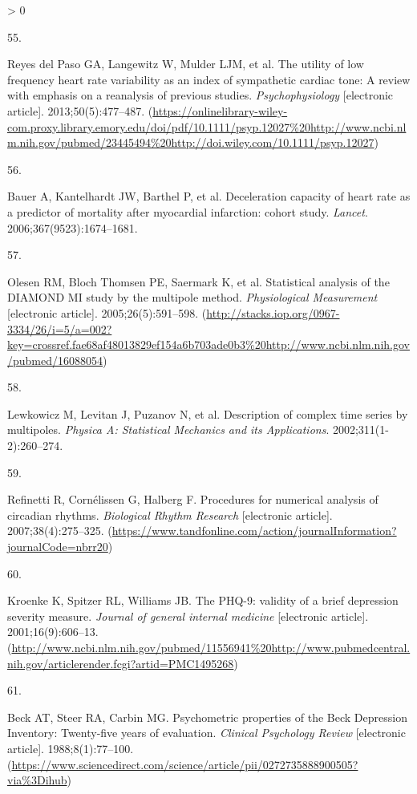 \documentclass[
  11pt,
  openany]{book}
\newlength{\cslhangindent}
\newlength{\csllabelwidth}
\newenvironment{CSLReferences}[2] %
 {%
  \setlength{\parindent}{0pt}
  \ifodd #1 \everypar{\setlength{\hangindent}{\cslhangindent}}\ignorespaces\fi
  \ifnum #2 > 0
  \setlength{\parskip}{#2\baselineskip}
  \fi
 }%
 {}
\newcommand{\CSLLeftMargin}[1]{\parbox[t]{\csllabelwidth}{#1}}
\newcommand{\CSLRightInline}[1]{\parbox[t]{\linewidth - \csllabelwidth}{#1}\break}
\begin{document}
\begin{CSLReferences}{0}{0}
\leavevmode\hypertarget{ref-ReyesdelPaso2013}{}%
\CSLLeftMargin{55. }
\CSLRightInline{Reyes del Paso GA, Langewitz W, Mulder LJM, et al. {The utility of low frequency heart rate variability as an index of sympathetic cardiac tone: A review with emphasis on a reanalysis of previous studies}. \emph{Psychophysiology} {[}electronic article{]}. 2013;50(5):477--487. (\url{https://onlinelibrary-wiley-com.proxy.library.emory.edu/doi/pdf/10.1111/psyp.12027\%20http://www.ncbi.nlm.nih.gov/pubmed/23445494\%20http://doi.wiley.com/10.1111/psyp.12027})}

\leavevmode\hypertarget{ref-Bauer2006c}{}%
\CSLLeftMargin{56. }
\CSLRightInline{Bauer A, Kantelhardt JW, Barthel P, et al. {Deceleration capacity of heart rate as a predictor of mortality after myocardial infarction: cohort study}. \emph{Lancet}. 2006;367(9523):1674--1681. }

\leavevmode\hypertarget{ref-Olesen2005}{}%
\CSLLeftMargin{57. }
\CSLRightInline{Olesen RM, Bloch Thomsen PE, Saermark K, et al. {Statistical analysis of the DIAMOND MI study by the multipole method}. \emph{Physiological Measurement} {[}electronic article{]}. 2005;26(5):591--598. (\url{http://stacks.iop.org/0967-3334/26/i=5/a=002?key=crossref.fae68af48013829ef154a6b703ade0b3\%20http://www.ncbi.nlm.nih.gov/pubmed/16088054})}

\leavevmode\hypertarget{ref-Lewkowicz2002}{}%
\CSLLeftMargin{58. }
\CSLRightInline{Lewkowicz M, Levitan J, Puzanov N, et al. {Description of complex time series by multipoles}. \emph{Physica A: Statistical Mechanics and its Applications}. 2002;311(1-2):260--274. }

\leavevmode\hypertarget{ref-Refinetti2007}{}%
\CSLLeftMargin{59. }
\CSLRightInline{Refinetti R, Cornélissen G, Halberg F. {Procedures for numerical analysis of circadian rhythms}. \emph{Biological Rhythm Research} {[}electronic article{]}. 2007;38(4):275--325. (\url{https://www.tandfonline.com/action/journalInformation?journalCode=nbrr20})}

\leavevmode\hypertarget{ref-Kroenke2001}{}%
\CSLLeftMargin{60. }
\CSLRightInline{Kroenke K, Spitzer RL, Williams JB. {The PHQ-9: validity of a brief depression severity measure.} \emph{Journal of general internal medicine} {[}electronic article{]}. 2001;16(9):606--13. (\url{http://www.ncbi.nlm.nih.gov/pubmed/11556941\%20http://www.pubmedcentral.nih.gov/articlerender.fcgi?artid=PMC1495268})}

\leavevmode\hypertarget{ref-Beck1988}{}%
\CSLLeftMargin{61. }
\CSLRightInline{Beck AT, Steer RA, Carbin MG. {Psychometric properties of the Beck Depression Inventory: Twenty-five years of evaluation}. \emph{Clinical Psychology Review} {[}electronic article{]}. 1988;8(1):77--100. (\url{https://www.sciencedirect.com/science/article/pii/0272735888900505?via\%3Dihub})}


\end{CSLReferences}
\end{document}
